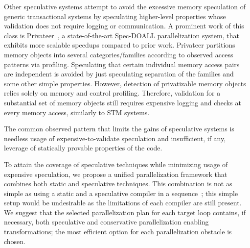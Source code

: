 Other speculative systems attempt to avoid the excessive memory speculation of
generic transactional systems by speculating higher-level properties whose
validation does not require logging or communication.
%
A prominent work of this class is Privateer~\cite{johnson:12:pldi:short}, a
state-of-the-art Spec-DOALL parallelization system, that exhibits more
scalable speedups compared to prior work.
%
Privateer partitions memory objects into several categories/families according
to observed access patterns via profiling.  Speculating that certain
individual memory access pairs are independent is avoided by just speculating
separation of the families and some other simple properties.  However, detection
of privatizable memory objects relies solely on memory and control profiling.
Therefore, validation for a substantial set of memory objects still requires
expensive logging and checks at every memory access, similarly to STM systems.
%

The common observed pattern that limits the gains of speculative systems is
needless usage of expensive-to-validate speculation and insufficient, if any,
leverage of statically provable properties of the code.

To attain the coverage of speculative techniques while minimizing usage of
expensive speculation,
we propose a unified parallelization framework that combines both static and
speculative techniques.
This combination is not as simple as using a static and a speculative compiler
in a sequence~\cite{kim:12:cgo}; this simple setup would be undesirable as
the limitations of each compiler are still present.
%
We suggest that the selected parallelization plan for each target loop contains,
if necessary, both speculative and conservative parallelization enabling
transformations; the most efficient option for each parallelization obstacle is
chosen.
%
%

